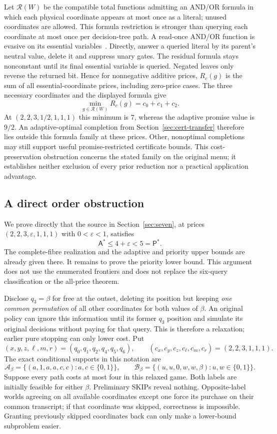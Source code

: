 \documentclass[pdflatex,sn-mathphys-num]{sn-jnl}
\newcommand{\A}{\mathsf{A}}
\newcommand{\Pcost}{\mathsf{P}}
\theoremstyle{thmstyleone}
\theoremstyle{thmstylethree}
\theoremstyle{thmstyletwo}
\begin{document}
Let $\mathcal R(W)$ be the compatible total functions admitting an AND/OR formula in which each physical coordinate appears at most once as a literal; unused coordinates are allowed. This formula restriction is stronger than querying each coordinate at most once per decision-tree path. A read-once AND/OR function is evasive on its essential variables~\cite{charikar02}. Directly, answer a queried literal by its parent's neutral value, delete it and suppress unary gates. The residual formula stays nonconstant until its final essential variable is queried. Negated leaves only reverse the returned bit. Hence for nonnegative additive prices, $R_c(g)$ is the sum of all essential-coordinate prices, including zero-price cases. The three necessary coordinates and the displayed formula give
\[
 \min_{g\in\mathcal R(W)}R_c(g)=c_0+c_1+c_2.
\]
At $(2,2,3,1/2,1,1,1)$ this minimum is $7$, whereas the adaptive promise value is $9/2$. An adaptive-optimal completion from Section~\ref{sec:cert-transfer} therefore lies outside this formula family at these prices. Other, nonoptimal completions may still support useful promise-restricted certificate bounds. This cost-preservation obstruction concerns the stated family on the original menu; it establishes neither exclusion of every prior reduction nor a practical application advantage.

\subsection{A direct order obstruction}
\label{app:order-obstruction}

We prove directly that the source in Section~\ref{sec:seven}, at prices
$(2,2,3,\varepsilon,1,1,1)$ with $0<\varepsilon<1$, satisfies
\[
 \A^*\le 4+\varepsilon<5=\Pcost^*.
\]
The complete-fibre realization and the adaptive and priority upper bounds
are already given there. It remains to prove the priority lower bound.
This argument does not use the enumerated frontiers and does not replace
the six-query classification or the all-price theorem.

Disclose $q_3=\beta$ for free at the outset, deleting its position but
keeping \emph{one common permutation} of all other coordinates for both
values of $\beta$. An original policy can ignore this information until
its former $q_3$ position and simulate its original decisions without
paying for that query. This is therefore a relaxation; earlier pure
stopping can only lower cost. Put
\[
 (x,y,z,\ell,m,r)=(q_0,q_1,q_2,q_4,q_5,q_6),
 \qquad (c_x,c_y,c_z,c_\ell,c_m,c_r)=(2,2,3,1,1,1).
\]
The exact conditional supports in this notation are
\[
 \mathcal A_\beta=\{(a,1,a,a,c,c):a,c\in\{0,1\}\},\qquad
 \mathcal B_\beta=\{(u,u,0,w,w,\beta):u,w\in\{0,1\}\}.
\]
Suppose every path costs at most four in this relaxed game. Both labels
are initially feasible for either $\beta$. Preliminary SKIPs reveal
nothing. Opposite-label worlds agreeing on all available coordinates
except one force its purchase on their common transcript; if that
coordinate was skipped, correctness is impossible. Granting previously
skipped coordinates back can only make a lower-bound subproblem easier.
\end{document}
